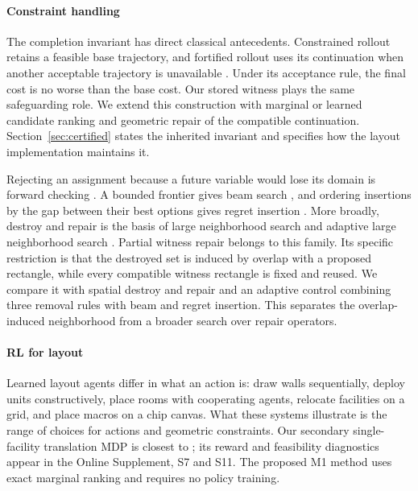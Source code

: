 \documentclass[preprint,12pt,authoryear,nonatbib]{elsarticle}
\begin{document}
\paragraph{Constraint handling}
The completion invariant has direct classical antecedents. Constrained rollout
retains a feasible base trajectory, and fortified rollout uses its continuation
when another acceptable trajectory is unavailable
\citep{Bertsekas2005Constrained,Bertsekas2020Constrained}. Under its acceptance
rule, the final cost is no worse than the base cost. Our stored witness plays the
same safeguarding role. We extend this construction with marginal or learned
candidate ranking and geometric repair of the compatible continuation.
Section~\ref{sec:certified} states the inherited invariant and specifies how the
layout implementation maintains it.

Rejecting an assignment because a future variable would lose its domain is
forward checking \citep{Haralick1980}. A bounded frontier gives beam search
\citep{Ow1988Beam}, and ordering insertions by the gap between their best options
gives regret insertion \citep{Potvin1993Regret}. More broadly, destroy and repair
is the basis of large neighborhood search and adaptive large neighborhood search
\citep{Ropke2006ALNS}. Partial witness repair belongs to this family. Its specific
restriction is that the destroyed set is induced by overlap with a proposed
rectangle, while every compatible witness rectangle is fixed and reused. We
compare it with spatial destroy and repair and an adaptive control combining
three removal rules with beam and regret insertion. This separates the
overlap-induced neighborhood from a broader search over repair operators.

\paragraph{RL for layout}
Learned layout agents differ in what an action is: \citet{kakooee2024reimagining}
draw walls sequentially, \citet{Ikeda2022FacilityRL} deploy units constructively,
\citet{GanLuo2025MADRL} place rooms with cooperating agents,
\citet{Heinbach2023MDPRL} relocate facilities on a grid, and
\citet{Mirhoseini2021Chip} place macros on a chip canvas. What these systems
illustrate is the range of choices for actions and geometric constraints.
Our secondary single-facility translation MDP is closest to
\citet{Heinbach2023MDPRL}; its reward and feasibility diagnostics appear in the
Online Supplement, S7 and S11. The proposed M1 method uses exact marginal
ranking and requires no policy training.
\end{document}
